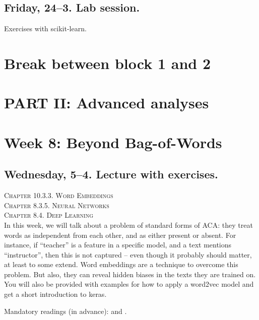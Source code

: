 \subsection*{Friday, 24--3. Lab session.}
Exercises with scikit-learn.




\section*{Break between block 1 and 2}




\section*{PART II: Advanced analyses}


\section*{Week 8: Beyond Bag-of-Words}

\subsection*{Wednesday, 5--4. Lecture with exercises.}
\textsc{ Chapter 10.3.3. Word Embeddings}\\
\textsc{ Chapter 8.3.5. Neural Networks}\\
\textsc{ Chapter 8.4. Deep Learning}\\

In this week, we will talk about a problem of standard forms of ACA: they treat words as independent from each other, and as either present or absent. For instance, if ``teacher'' is a feature in a specific model, and a text mentions ``instructor'', then this is not captured -- even though it probably should matter, at least to some extend. Word embeddings are a technique to overcome this problem. But also, they can reveal hidden biases in the texts they are trained on. You will also be provided with examples for how to apply a word2vec model and get a short introduction to keras.

Mandatory readings (in advance): \cite{Kusner2015} and \cite{Garg2017}.





